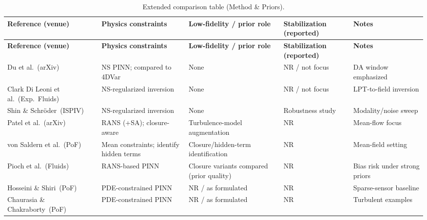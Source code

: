 \documentclass[master]{NTHUthesis}
\begin{document}
\begin{CJK*}{UTF8}{bsmi}
\begin{longtable}{
    >{\raggedright\arraybackslash}p{2.3cm}
    >{\raggedright\arraybackslash}p{2.6cm}
    >{\raggedright\arraybackslash}p{3.0cm}
    >{\raggedright\arraybackslash}p{2.6cm}
    >{\raggedright\arraybackslash}p{2.3cm}
}
\caption{Extended comparison table (Method \& Priors).}
\label{tab:lit_method_priors}\\
\toprule
\textbf{Reference (venue)} & \textbf{Physics constraints} & \textbf{Low-fidelity / prior role} & \textbf{Stabilization (reported)} & \textbf{Notes} \\
\midrule
\endfirsthead
\toprule
\textbf{Reference (venue)} & \textbf{Physics constraints} & \textbf{Low-fidelity / prior role} & \textbf{Stabilization (reported)} & \textbf{Notes} \\
\midrule
\endhead
Du et al.\ (arXiv)~\cite{du2022stateestimationminimalturbulent} & NS PINN; compared to 4DVar & None & NR / not focus & DA window emphasized \\
Clark Di Leoni et al.\ (Exp.\ Fluids)~\cite{Clark_Di_Leoni_2023} & NS-regularized inversion & None & NR / not focus & LPT-to-field inversion \\
Shin \& Schr{\"o}der\ (ISPIV)~\cite{shin2025robust} & NS-regularized inversion & None & Robustness study & Modality/noise sweep \\
Patel et al.\ (arXiv)~\cite{patel2024turbulencemodelaugmentedphysics} & RANS (+SA); closure-aware & Turbulence-model augmentation & NR & Mean-flow focus \\
von Saldern et al.\ (PoF)~\cite{von_Saldern_2022} & Mean constraints; identify hidden terms & Closure/hidden-term identification & NR & Mean-field setting \\
Pioch et al.\ (Fluids)~\cite{fluids8020043} & RANS-based PINN & Closure variants compared (prior quality) & NR & Bias risk under strong priors \\
Hosseini \& Shiri\ (PoF)~\cite{10.1063/5.0211680} & PDE-constrained PINN & NR / as formulated & NR & Sparse-sensor baseline \\
Chaurasia \& Chakraborty\ (PoF)~\cite{10.1063/5.0218611} & PDE-constrained PINN & NR / as formulated & NR & Turbulent examples \\
\bottomrule
\end{longtable}


\end{CJK*}
\end{document}
